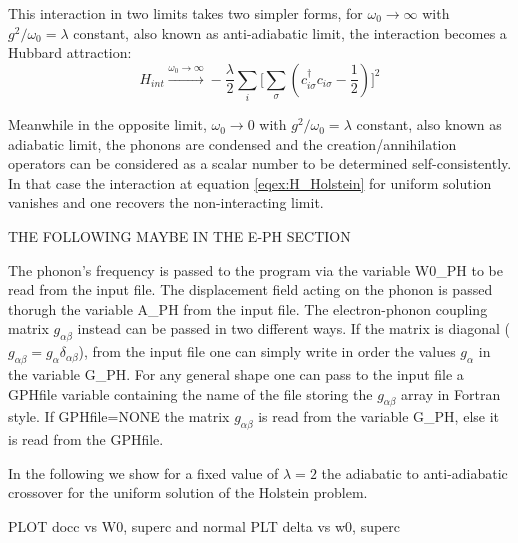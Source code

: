 \documentclass[edipack2.tex]{subfiles}
\begin{document}
This interaction in two limits takes two simpler forms, for $\omega_0 \rightarrow \infty$ with $g^2/\omega_0=\lambda$ constant, also known as anti-adiabatic limit, the interaction becomes a Hubbard attraction:
\begin{equation}
    H_{int} \overset{ \omega_0 \rightarrow \infty}{ \longrightarrow } -\frac{\lambda}{2} \sum_i \Big[\sum_\sigma(c^\dagger_{i\sigma}c_{i\sigma} -\frac{1}{2}) \Big]^2
\end{equation}

Meanwhile in the opposite limit, $\omega_0 \rightarrow 0$ with $g^2/\omega_0=\lambda$ constant, also known as adiabatic limit, the phonons are condensed and the creation/annihilation operators can be considered as a scalar number to be determined self-consistently. In that case the interaction at equation \eqref{eqex:H_Holstein} for uniform solution vanishes and one recovers the non-interacting limit.

THE FOLLOWING MAYBE IN THE E-PH SECTION

The phonon's frequency is passed to the \NAME program via the variable W0\_PH to be read from the input file. The displacement field acting on the phonon is passed thorugh the variable A\_PH from the input file. The electron-phonon coupling matrix $g_{\alpha \beta}$ instead can be passed in two different ways. If the matrix is diagonal ($g_{\alpha \beta} = g_\alpha \delta_{\alpha \beta}$), from the input file one can simply write in order the values $g_\alpha$ in the variable G\_PH. For any general shape one can pass to the input file a GPHfile variable containing the name of the file storing the $g_{\alpha \beta}$ array in Fortran style.
If GPHfile=NONE the matrix $g_{\alpha \beta}$ is read from the variable G\_PH, else it is read from the GPHfile.

In the following we show for a fixed value of $\lambda=2$ the adiabatic to anti-adiabatic crossover for the uniform solution of the Holstein problem.

PLOT docc vs W0, superc and normal
PLT delta vs w0, superc
\end{document}
